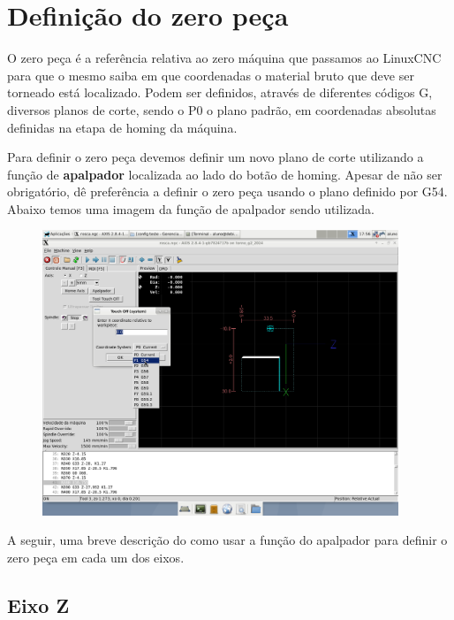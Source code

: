 \documentclass[twoside,a4paper]{refart}
\begin{document}
\section{Definição do zero peça}

O zero peça é a referência relativa ao zero máquina que passamos ao LinuxCNC para que o mesmo saiba em que coordenadas o material bruto que deve ser torneado está localizado. Podem ser definidos, através de diferentes códigos G, diversos planos de corte, sendo o P0 o plano padrão, em coordenadas absolutas definidas na etapa de homing da máquina.

Para definir o zero peça devemos definir um novo plano de corte utilizando a função de \textbf{apalpador} localizada ao lado do botão de homing. Apesar de não ser obrigatório, dê preferência a definir o zero peça usando o plano definido por G54. Abaixo temos uma imagem da função de apalpador sendo utilizada.

\begin{figure}[H]
    \begin{center}
        \includegraphics[width=0.95\textwidth]{imagens/Definicao_do_zero_peca_g54.png}
    \end{center}
    \caption{}\label{G54}
\end{figure}


A seguir, uma breve descrição do como usar a função do apalpador para definir o zero peça em cada um dos eixos.

\subsection{Eixo Z}
\end{document}
